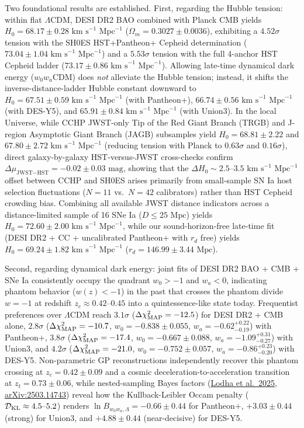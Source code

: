 \documentclass[11pt,letterpaper]{article}
\begin{document}
{Two foundational results are established. First, regarding the Hubble tension: within flat $\Lambda$CDM, DESI DR2 BAO combined with Planck CMB yields $H_0 = 68.17 \pm 0.28\text{ km s}^{-1}\text{ Mpc}^{-1}$ ($\Omega_m = 0.3027 \pm 0.0036$), exhibiting a $4.52\sigma$ tension with the SH0ES HST+Pantheon+ Cepheid determination ($73.04 \pm 1.04\text{ km s}^{-1}\text{ Mpc}^{-1}$) and a $5.53\sigma$ tension with the full 4-anchor HST Cepheid ladder ($73.17 \pm 0.86\text{ km s}^{-1}\text{ Mpc}^{-1}$). Allowing late-time dynamical dark energy ($w_0 w_a$CDM) does \emph{not} alleviate the Hubble tension; instead, it shifts the inverse-distance-ladder Hubble constant downward to $H_0 = 67.51 \pm 0.59\text{ km s}^{-1}\text{ Mpc}^{-1}$ (with Pantheon+), $66.74 \pm 0.56\text{ km s}^{-1}\text{ Mpc}^{-1}$ (with DES-Y5), and $65.91 \pm 0.84\text{ km s}^{-1}\text{ Mpc}^{-1}$ (with Union3). In the local Universe, while CCHP JWST-only Tip of the Red Giant Branch (TRGB) and J-region Asymptotic Giant Branch (JAGB) subsamples yield $H_0 = 68.81 \pm 2.22$ and $67.80 \pm 2.72\text{ km s}^{-1}\text{ Mpc}^{-1}$ (reducing tension with Planck to $0.63\sigma$ and $0.16\sigma$), direct galaxy-by-galaxy HST-versus-JWST cross-checks confirm $\Delta\mu_{\text{JWST}-\text{HST}} = -0.02 \pm 0.03\text{ mag}$, showing that the $\Delta H_0 \sim 2.5\text{--}3.5\text{ km s}^{-1}\text{ Mpc}^{-1}$ offset between CCHP and SH0ES arises primarily from small-sample SN Ia host selection fluctuations ($N=11$ vs.\ $N=42$ calibrators) rather than HST Cepheid crowding bias. Combining all available JWST distance indicators across a distance-limited sample of 16 SNe Ia ($D \le 25\text{ Mpc}$) yields $H_0 = 72.60 \pm 2.00\text{ km s}^{-1}\text{ Mpc}^{-1}$, while our sound-horizon-free late-time fit (DESI DR2 + CC + uncalibrated Pantheon+ with $r_d$ free) yields $H_0 = 69.24 \pm 1.82\text{ km s}^{-1}\text{ Mpc}^{-1}$ ($r_d = 146.99 \pm 3.44\text{ Mpc}$).

Second, regarding dynamical dark energy: joint fits of DESI DR2 BAO + CMB + SNe Ia consistently occupy the quadrant $w_0 > -1$ and $w_a < 0$, indicating phantom behavior ($w(z) < -1$) in the past that crosses the phantom divide $w = -1$ at redshift $z_c \approx 0.42\text{--}0.45$ into a quintessence-like state today. Frequentist preferences over $\Lambda$CDM reach $3.1\sigma$ ($\Delta\chi^2_{\rm MAP} = -12.5$) for DESI DR2 + CMB alone, $2.8\sigma$ ($\Delta\chi^2_{\rm MAP} = -10.7$, $w_0 = -0.838 \pm 0.055$, $w_a = -0.62^{+0.22}_{-0.19}$) with Pantheon+, $3.8\sigma$ ($\Delta\chi^2_{\rm MAP} = -17.4$, $w_0 = -0.667 \pm 0.088$, $w_a = -1.09^{+0.31}_{-0.27}$) with Union3, and $4.2\sigma$ ($\Delta\chi^2_{\rm MAP} = -21.0$, $w_0 = -0.752 \pm 0.057$, $w_a = -0.86^{+0.23}_{-0.20}$) with DES-Y5. Non-parametric GP reconstructions independently recover this phantom crossing at $z_c = 0.42 \pm 0.09$ and a cosmic deceleration-to-acceleration transition at $z_t = 0.73 \pm 0.06$, while nested-sampling Bayes factors (\href{https://arxiv.org/abs/2503.14743}{Lodha et al.\ 2025, arXiv:2503.14743}) reveal how the Kullback-Leibler Occam penalty ($\mathcal{D}_{\rm KL} \approx 4.5\text{--}5.2$) renders $\ln B_{w_0w_a,\Lambda} = -0.66 \pm 0.44$ for Pantheon+, $+3.03 \pm 0.44$ (strong) for Union3, and $+4.88 \pm 0.44$ (near-decisive) for DES-Y5.
}
\end{document}
